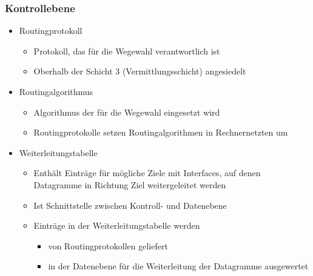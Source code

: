     \subsubsection{Kontrollebene}
      \begin{itemize}
        \item Routingprotokoll
          \begin{itemize}
            \item Protokoll, das für die Wegewahl verantwortlich ist
            \item Oberhalb der Schicht 3 (Vermittlungsschicht) angesiedelt
          \end{itemize}
        \item Routingalgorithmus
          \begin{itemize}
            \item Algorithmus der für die Wegewahl eingesetzt wird
            \item Routingprotokolle setzen Routingalgorithmen in Rechnernetzten um
          \end{itemize}
        \item Weiterleitungstabelle
          \begin{itemize}
            \item Enthält Einträge für mögliche Ziele mit Interfaces, auf denen Datagramme in Richtung
              Ziel weitergeleitet werden
            \item Ist Schnittstelle zwischen Kontroll- und Datenebene
            \item Einträge in der Weiterleitungstabelle werden
              \begin{itemize}
                \item von Routingprotokollen geliefert
                \item in der Datenebene für die Weiterleitung der Datagramme ausgewertet
              \end{itemize}
          \end{itemize}
      \end{itemize}
